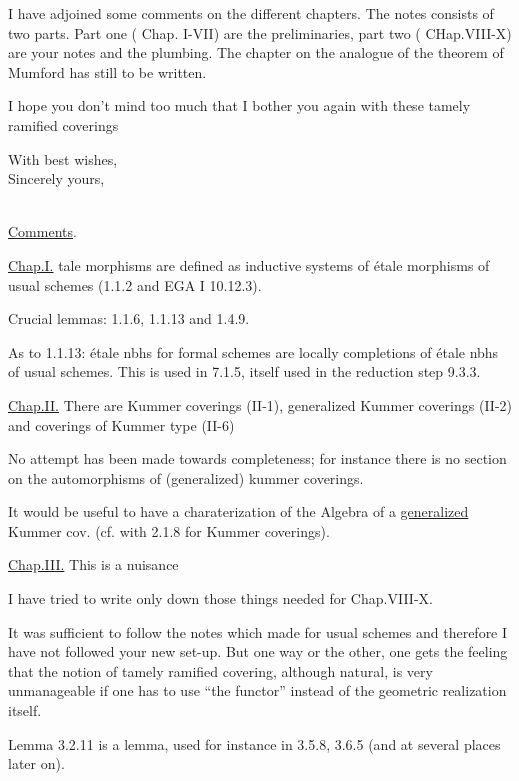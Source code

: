 I have adjoined some comments on the different chapters. The notes consists of two parts. Part one ( Chap. I-VII) are the preliminaries, part two ( CHap.VIII-X) are your notes and the plumbing. The chapter on the analogue of the theorem of Mumford has still to be written.

I hope you don't mind too much that I bother you again with these tamely ramified coverings\handwritten{!}

With best wishes,\\
Sincerely yours,\\
\\

\uline{Comments}.

\uline{Chap.I.} tale morphisms are defined as inductive systems of étale morphisms of usual schemes (1.1.2 and EGA I 10.12.3).

Crucial lemmas: 1.1.6, 1.1.13 and 1.4.9.

As to 1.1.13: étale nbhs for formal schemes are locally completions of étale nbhs of usual schemes. This is used in 7.1.5, itself used in the reduction step 9.3.3.

\uline{Chap.II.} There are Kummer coverings (II-1), generalized Kummer coverings (II-2) and coverings of Kummer type (II-6)\handwritten{!}

No attempt has been made towards completeness; for instance there is no section on the automorphisms of (generalized) kummer coverings.

It would be useful to have a charaterization of the Algebra of a \uline{generalized} Kummer cov. (cf. with 2.1.8 for Kummer coverings).

\uline{Chap.III.} This is a nuisance\handwritten{!}

I have tried to write only down those things needed for Chap.VIII-X.

It was sufficient to follow the notes which  made for usual schemes and therefore I have not followed your new set-up. But one way or the other, one gets the feeling that the notion of tamely ramified covering, although natural, is very unmanageable if one has to use ``the functor'' instead of the geometric realization itself.

Lemma 3.2.11 is a  lemma, used for instance in 3.5.8, 3.6.5 (and  at several places later on).


